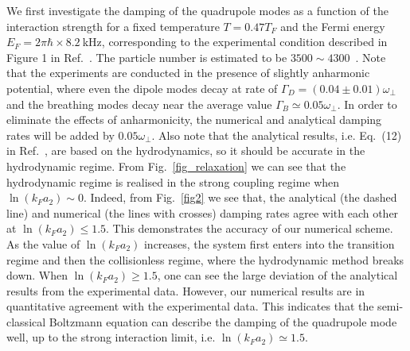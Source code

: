 We first investigate the damping of the quadrupole modes as a function of the interaction strength for a fixed temperature $T=0.47T_F$ and the Fermi energy $E_F=2\pi\hbar\times8.2~$kHz, corresponding to the experimental condition described in Figure 1 in Ref.~\cite{Vogt2012}. The particle number is estimated to be $3500\sim4300$~\cite{bruun_2012}. Note that the experiments are conducted in the presence of slightly anharmonic potential, where even the dipole modes decay at rate of $\Gamma_D=(0.04\pm0.01)\omega_\bot$ and the breathing modes decay near the average value $\Gamma_B\simeq0.05\omega_\bot$. In order to eliminate the effects of anharmonicity, the numerical and analytical damping rates will be added by $0.05\omega_\bot$.  Also note that the analytical results, i.e. Eq.~(12) in Ref.~\cite{bruun_2012}, are based on the hydrodynamics, so it should be accurate in the hydrodynamic regime. From Fig.~\ref{fig_relaxation} we can see that the hydrodynamic regime is realised in the strong coupling regime when $\ln(k_Fa_2)\sim0$. Indeed, from Fig.~\ref{fig2} we see that, the analytical (the dashed line) and numerical (the lines with crosses) damping rates agree with each other at $\ln(k_Fa_2)\leq1.5$. This demonstrates the accuracy of our numerical scheme. As the value of $\ln(k_Fa_2)$ increases, the system first enters into the transition regime and then the collisionless regime, where the hydrodynamic method breaks down. When $\ln(k_Fa_2)\geq1.5$, one can see the large deviation of the analytical results from the experimental data. However, our numerical results are in quantitative agreement with the experimental data. This indicates that the semi-classical Boltzmann equation can describe the damping of the quadrupole mode well, up to the strong interaction limit, i.e. $\ln(k_Fa_2)\simeq1.5$.

